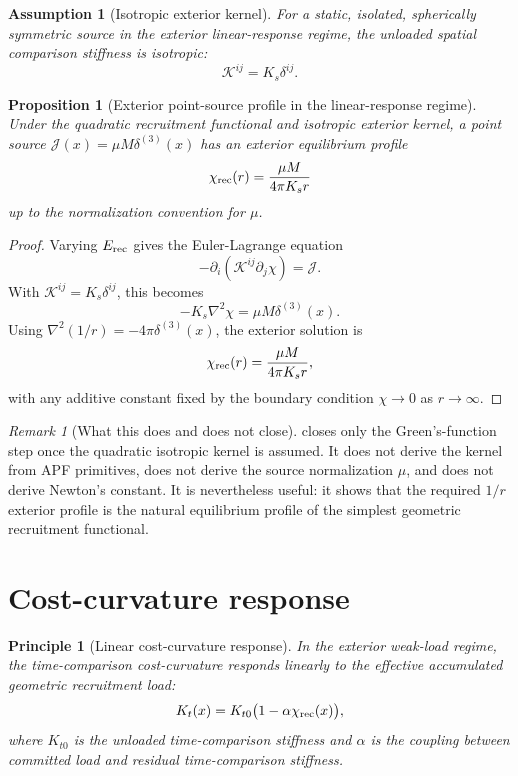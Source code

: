 \documentclass[11pt]{article}
\newtheorem{proposition}[theorem]{Proposition}
\newtheorem{assumption}[theorem]{Assumption}
\newtheorem{principle}[theorem]{Principle}
\theoremstyle{remark}
\newtheorem{remark}[theorem]{Remark}
\newcommand{\Erec}{E_{\rm rec}}
\newcommand{\Kgeom}{\mathcal K}
\newcommand{\Jsrc}{\mathcal J}
\begin{document}
\begin{assumption}[Isotropic exterior kernel]
For a static, isolated, spherically symmetric source in the exterior linear-response regime, the unloaded spatial comparison stiffness is isotropic:
\[
        \Kgeom^{ij}=K_s\delta^{ij}.
\]
\end{assumption}

\begin{proposition}[Exterior point-source profile in the linear-response regime]
\label{prop:point-source-profile}
Under the quadratic recruitment functional and isotropic exterior kernel, a point source \(\Jsrc(x)=\mu M\delta^{(3)}(x)\) has an exterior equilibrium profile
\[
        \chi_{\rm rec}(r)=\frac{\mu M}{4\pi K_s r}
\]
up to the normalization convention for \(\mu\).
\end{proposition}

\begin{proof}
Varying \(\Erec\) gives the Euler-Lagrange equation
\[
        -\partial_i(\Kgeom^{ij}\partial_j\chi)=\Jsrc.
\]
With \(\Kgeom^{ij}=K_s\delta^{ij}\), this becomes
\[
        -K_s\nabla^2\chi=\mu M\delta^{(3)}(x).
\]
Using \(\nabla^2(1/r)=-4\pi\delta^{(3)}(x)\), the exterior solution is
\[
        \chi_{\rm rec}(r)=\frac{\mu M}{4\pi K_s r},
\]
with any additive constant fixed by the boundary condition \(\chi\to0\) as \(r\to\infty\).
\end{proof}

\begin{remark}[What this does and does not close]
 closes only the Green's-function step once the quadratic isotropic kernel is assumed.  It does not derive the kernel from APF primitives, does not derive the source normalization \(\mu\), and does not derive Newton's constant.  It is nevertheless useful: it shows that the required \(1/r\) exterior profile is the natural equilibrium profile of the simplest geometric recruitment functional.
\end{remark}

\section{Cost-curvature response}

\begin{principle}[Linear cost-curvature response]
In the exterior weak-load regime, the time-comparison cost-curvature responds linearly to the effective accumulated geometric recruitment load:
\[
        K_t(x)=K_{t0}\bigl(1-\alpha\chi_{\rm rec}(x)\bigr),
\]
where \(K_{t0}\) is the unloaded time-comparison stiffness and \(\alpha\) is the coupling between committed load and residual time-comparison stiffness.
\end{principle}
\end{document}
